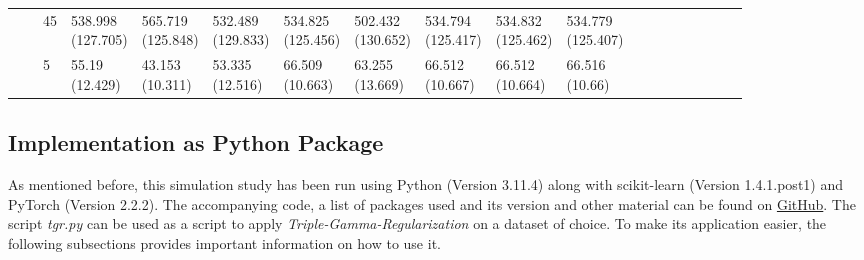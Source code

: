 \documentclass[12pt,a4paper]{article}
\begin{document}
\begin{landscape}
\begin{longtable}{lllllllllllrrrrrrrr}
 &  & 45 & \makecell{538.998 \\ (127.705)} & \makecell{565.719 \\ (125.848)} & \makecell{532.489 \\ (129.833)} & \makecell{534.825 \\ (125.456)} & \makecell{502.432 \\ (130.652)} & \makecell{534.794 \\ (125.417)} & \makecell{534.832 \\ (125.462)} & \makecell{534.779 \\ (125.407)}  \\
 &  & 5 & \makecell{55.19 \\ (12.429)} & \makecell{43.153 \\ (10.311)} & \makecell{53.335 \\ (12.516)} & \makecell{66.509 \\ (10.663)} & \makecell{63.255 \\ (13.669)} & \makecell{66.512 \\ (10.667)} & \makecell{66.512 \\ (10.664)} & \makecell{66.516 \\ (10.66)} \\
\cline{1-19} \cline{2-19}
\bottomrule
\end{longtable}
\label{tab:PredSim}
\end{landscape}



\subsection{Implementation as Python Package}
As mentioned before, this simulation study has been run using Python (Version 3.11.4) along with scikit-learn (Version 1.4.1.post1) and PyTorch (Version 2.2.2). The accompanying code, a list of packages used and its version and other material can be found on \href{https://github.com/therealLucasPaul/MScThesis_Econ}{GitHub}. The script \textit{tgr.py} can be used as a script to apply \textit{Triple-Gamma-Regularization} on a dataset of choice. To make its application easier, the following subsections provides important information on how to use it.
\end{document}
